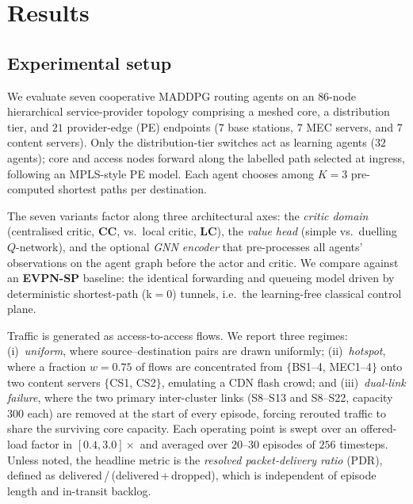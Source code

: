 \section{Results}
\label{sec:results}

\subsection{Experimental setup}
\label{sec:setup}

We evaluate seven cooperative MADDPG routing agents on an $86$-node hierarchical
service-provider topology comprising a meshed core, a distribution tier, and
$21$ provider-edge (PE) endpoints ($7$ base stations, $7$ MEC servers, and
$7$ content servers). Only the distribution-tier switches act as learning
agents ($32$ agents); core and access nodes forward along the labelled path
selected at ingress, following an MPLS-style PE model. Each agent chooses among
$K{=}3$ pre-computed shortest paths per destination.

The seven variants factor along three architectural axes: the
\emph{critic domain} (centralised critic, \textbf{CC}, vs.\ local critic,
\textbf{LC}), the \emph{value head} (simple vs.\ duelling $Q$-network), and the
optional \emph{GNN encoder} that pre-processes all agents' observations on the
agent graph before the actor and critic. We compare against an
\textbf{EVPN-SP} baseline: the identical forwarding and queueing model driven by
deterministic shortest-path (k$=0$) tunnels, i.e.\ the learning-free classical
control plane.

Traffic is generated as access-to-access flows. We report three regimes:
(i)~\emph{uniform}, where source--destination pairs are drawn uniformly;
(ii)~\emph{hotspot}, where a fraction $w{=}0.75$ of flows are concentrated from
$\{$BS1--4, MEC1--4$\}$ onto two content servers $\{$CS1, CS2$\}$, emulating a
CDN flash crowd; and (iii)~\emph{dual-link failure}, where the two primary
inter-cluster links (S8--S13 and S8--S22, capacity $300$ each) are removed at
the start of every episode, forcing rerouted traffic to share the surviving
core capacity. Each operating point is swept over an offered-load factor in
$[0.4, 3.0]\times$ and averaged over $20$--$30$ episodes of $256$ timesteps.
Unless noted, the headline metric is the \emph{resolved packet-delivery ratio}
(PDR), defined as delivered\,/\,(delivered\,+\,dropped), which is independent of
episode length and in-transit backlog.

